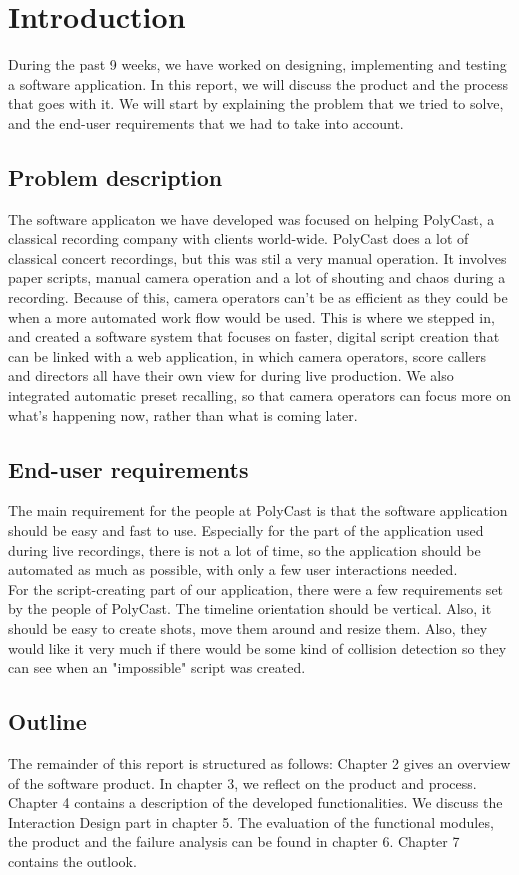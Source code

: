 \section{Introduction}

During the past 9 weeks, we have worked on designing, implementing and testing a software application. In this report, we will discuss the product and the process that goes with it. We will start by explaining the problem that we tried to solve, and the end-user requirements that we had to take into account.

\subsection*{Problem description}
The software applicaton we have developed was focused on helping PolyCast, a classical recording company with clients world-wide. PolyCast does a lot of classical concert recordings, but this was stil a very manual operation. It involves paper scripts, manual camera operation and a lot of shouting and chaos during a recording. Because of this, camera operators can't be as efficient as they could be when a more automated work flow would be used. This is where we stepped in, and created a software system that focuses on faster, digital script creation that can be linked with a web application, in which camera operators, score callers and directors all have their own view for during live production. We also integrated automatic preset recalling, so that camera operators can focus more on what's happening now, rather than what is coming later.

\subsection*{End-user requirements}
The main requirement for the people at PolyCast is that the software application should be easy and fast to use. Especially for the part of the application used during live recordings, there is not a lot of time, so the application should be automated as much as possible, with only a few user interactions needed.\\
For the script-creating part of our application, there were a few requirements set by the people of PolyCast. The timeline orientation should be vertical. Also, it should be easy to create shots, move them around and resize them. Also, they would like it very much if there would be some kind of collision detection so they can see when an "impossible" script was created.

\subsection*{Outline}
The remainder of this report is structured as follows: Chapter 2 gives an overview of the software product. In chapter 3, we reflect on the product and process. Chapter 4 contains a description of the developed functionalities. We discuss the Interaction Design part in chapter 5. The evaluation of the functional modules, the product and the failure analysis can be found in chapter 6. Chapter 7 contains the outlook.